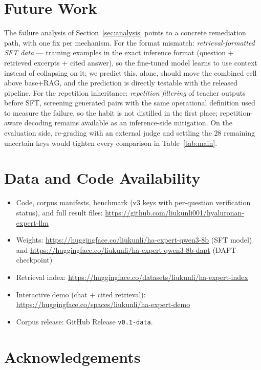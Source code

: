 \documentclass[11pt]{article}
\begin{document}
\section{Future Work}
\label{sec:future}

The failure analysis of Section~\ref{sec:analysis} points to a concrete
remediation path, with one fix per mechanism. For the format mismatch:
\emph{retrieval-formatted SFT data} --- training examples in the exact
inference format (question + retrieved excerpts + cited answer), so the
fine-tuned model learns to use context instead of collapsing on it; we
predict this, alone, should move the combined cell above base+RAG, and
the prediction is directly testable with the released pipeline. For the
repetition inheritance: \emph{repetition filtering} of teacher outputs
before SFT, screening generated pairs with the same operational
definition used to measure the failure, so the habit is not distilled in
the first place; repetition-aware decoding remains available as an
inference-side mitigation. On the evaluation side, re-grading with an
external judge and settling the 28 remaining uncertain keys would tighten
every comparison in Table~\ref{tab:main}.

\section{Data and Code Availability}
\label{sec:availability}

\begin{itemize}
\item Code, corpus manifests, benchmark (v3 keys with per-question
verification status), and full result files:
\url{https://github.com/liukunli001/hyaluronan-expert-llm}
\item Weights: \url{https://huggingface.co/liukunli/ha-expert-qwen3-8b}
(SFT model) and
\url{https://huggingface.co/liukunli/ha-expert-qwen3-8b-dapt} (DAPT
checkpoint)
\item Retrieval index:
\url{https://huggingface.co/datasets/liukunli/ha-expert-index}
\item Interactive demo (chat + cited retrieval):
\url{https://huggingface.co/spaces/liukunli/ha-expert-demo}
\item Corpus release: GitHub Release \texttt{v0.1-data}.
\end{itemize}

\section*{Acknowledgements}
\end{document}

